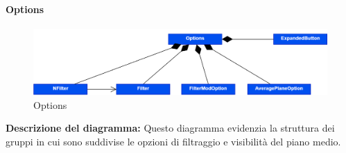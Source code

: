 \paragraph{Options}
\begin{figure}[h!] \centering
      \includegraphics[scale=0.3]{template/images/uml_front/ui/Options.png}
      \caption{Options}
\end{figure}
\textbf{Descrizione del diagramma:}
Questo diagramma evidenzia la struttura dei gruppi in cui sono suddivise le opzioni di filtraggio e visibilità del piano medio.
